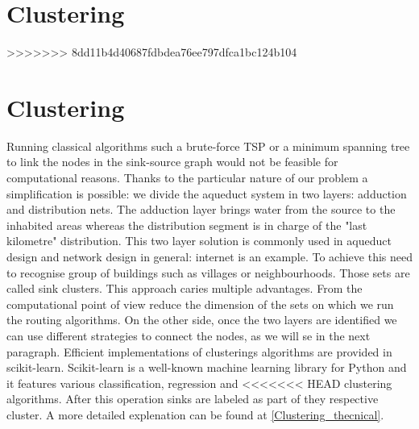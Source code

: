 \section{Clustering}
>>>>>>> 8dd11b4d40687fdbdea76ee797dfca1bc124b104

\section{Clustering}
Running classical algorithms such a brute-force TSP or a minimum spanning tree to link
the nodes in the sink-source graph would not be feasible for computational reasons. 
Thanks to the particular nature of our problem a simplification is possible: we divide the aqueduct system
in two layers: adduction and distribution nets. The adduction layer brings water from the
source to the inhabited areas whereas the distribution segment is in charge of the "last
kilometre" distribution. This two layer solution is commonly used in aqueduct design and
network design in general: internet is an example.
To achieve this need to recognise group of buildings such as villages or neighbourhoods. Those sets are called sink clusters.
This approach caries multiple advantages. From the computational point of view reduce the dimension of the sets on which we run the routing algorithms.  On the other side, once the two layers are identified we can use different strategies to connect the nodes, as we will se in the next paragraph.
Efficient implementations of clusterings algorithms are provided in scikit-learn. Scikit-learn is a well-known
machine learning library for Python and it features various classification, regression and
<<<<<<< HEAD
clustering algorithms. After this operation sinks are labeled as part of they respective cluster. 
A more detailed explenation can be found at \ref {Clustering_thecnical}.

